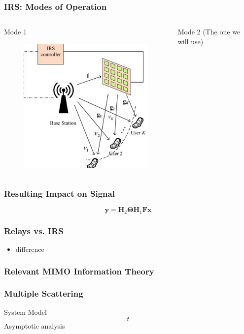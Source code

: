 \documentclass[10pt,tgadventor, onlymath]{beamer}
\begin{document}
\begin{frame}
\frametitle{IRS: Modes of Operation}
\begin{columns}
\begin{column}{0.5\linewidth}
	Mode 1
	\begin{figure}
		\includegraphics[scale=1]{irs}
	\end{figure}\end{column}
\begin{column}{0.5\linewidth}
	Mode 2 (The one we will use)

\end{column}
\end{columns}
\end{frame}

\begin{frame}
\frametitle{Resulting Impact on Signal}
\centering
\begin{equation}
\mathbf{y} = \mathbf{H}_2\boldsymbol{\Theta}\mathbf{H}_1\mathbf{F}\mathbf{x}
\end{equation}
\end{frame}


\begin{frame}
\frametitle{Relays vs. IRS}
\begin{itemize}
\item difference
\end{itemize}
\end{frame}


\subsubsection{Relevant MIMO Information Theory}
\begin{frame}
\frametitle{Multiple Scattering}
System Model
\begin{equation}
t
\end{equation}
Asymptotic analysis

\end{frame}
\end{document}
